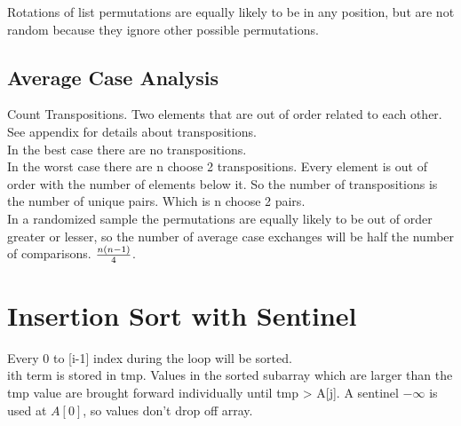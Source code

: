 \documentclass[english, 10pt]{article}
\begin{document}
    Rotations of list permutations are equally likely to be in any position, but are not random because they ignore other possible permutations.\\

\subsection{Average Case Analysis}
Count Transpositions. Two elements that are out of order related to each other. See appendix for details about transpositions. \\

In the best case there are no transpositions. \\
In the worst case there are n choose 2 transpositions. Every element is out of order with the number of elements below it.
So the number of transpositions is the number of unique pairs. Which is n choose 2 pairs. \\
In a randomized sample the permutations are equally likely to be out of order greater or lesser,
so the number of average case exchanges will be half the number of comparisons. $\frac{n(n-1)}{4}$.


\section{Insertion Sort with Sentinel}

Every 0 to [i-1] index during the loop will be sorted. \\
ith term is stored in tmp. Values in the sorted subarray which are larger than the tmp value are brought forward individually until tmp > A[j]. A sentinel $-\infty$ is used at $A[0]$, so values don't drop off array. \\
\end{document}
